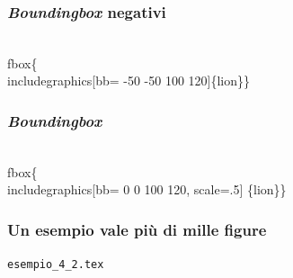 \documentclass[svgnames,%
	ucs,%
	pdftex]{guitbeamer}
\begin{document}
\begin{frame}
  \frametitle{\textit{Boundingbox} negativi}
	\begin{LaTeXcode}
		\\fbox\{\\includegraphics\alert{[bb= -50 -50 100 120]}\{lion\}\}
	\end{LaTeXcode}
	\begin{center}
	\end{center}
\end{frame}
\begin{frame}
  \frametitle{\textit{Boundingbox}}
	\begin{LaTeXcode}
		\\fbox\{\\includegraphics\alert{[bb= 0 0 100 120, scale=.5]}\n
		\{lion\}\}
	\end{LaTeXcode}
	\begin{center}
	\end{center}
\end{frame}
\begin{frame}
  \frametitle{Un esempio vale pi\`u di mille figure}
	\begin{center}
		\alert{\texttt{esempio\_4\_2.tex}}
	\end{center}
\end{frame}
\end{document}
